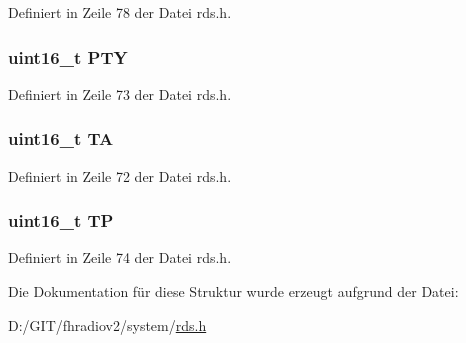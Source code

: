 Definiert in Zeile 78 der Datei rds.\+h.

\hypertarget{structgroup__0a_a0474967478fbbc2c71b800d2e0132d45}{}
\subsubsection[{P\+T\+Y}]{\setlength{\rightskip}{0pt plus 5cm}uint16\+\_\+t P\+T\+Y}\label{structgroup__0a_a0474967478fbbc2c71b800d2e0132d45}


Definiert in Zeile 73 der Datei rds.\+h.

\hypertarget{structgroup__0a_a6de7751205cef4ffcce610399a030892}{}
\subsubsection[{T\+A}]{\setlength{\rightskip}{0pt plus 5cm}uint16\+\_\+t T\+A}\label{structgroup__0a_a6de7751205cef4ffcce610399a030892}


Definiert in Zeile 72 der Datei rds.\+h.

\hypertarget{structgroup__0a_ab9e634c63b0d95a96716d5f6d7f06d72}{}
\subsubsection[{T\+P}]{\setlength{\rightskip}{0pt plus 5cm}uint16\+\_\+t T\+P}\label{structgroup__0a_ab9e634c63b0d95a96716d5f6d7f06d72}


Definiert in Zeile 74 der Datei rds.\+h.



Die Dokumentation für diese Struktur wurde erzeugt aufgrund der Datei\+:\begin{DoxyCompactItemize}
\item 
D\+:/\+G\+I\+T/fhradiov2/system/\hyperlink{rds_8h}{rds.\+h}\end{DoxyCompactItemize}
